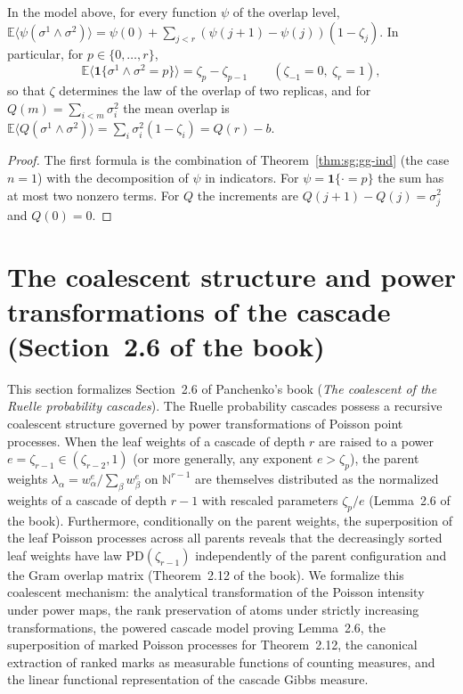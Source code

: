 \begin{theorem}\label{thm:sg:fop}
  \leanok
In the model above, for every function $\psi$ of the overlap level,
$\mathbb E\langle\psi(\sigma^1\wedge\sigma^2)\rangle=\psi(0)+\sum_{j<r}(\psi(j+1)-\psi(j))(1-\zeta_j)$. In particular, for $p\in\{0,\dots,r\}$,
\[
 \mathbb E\langle\mathbf 1\{\sigma^1\wedge\sigma^2=p\}\rangle=\zeta_p-\zeta_{p-1}\qquad(\zeta_{-1}=0,\ \zeta_r=1),
\]
so that $\zeta$ determines the law of the overlap of two replicas, and for $Q(m)=\sum_{i<m}\sigma_i^2$ the mean overlap is
$\mathbb E\langle Q(\sigma^1\wedge\sigma^2)\rangle=\sum_i\sigma_i^2(1-\zeta_i)=Q(r)-b$.
\end{theorem}
\begin{proof}
  \leanok
The first formula is the combination of Theorem~\ref{thm:sg:gg-ind} (the case $n=1$) with the decomposition of $\psi$ in indicators. For $\psi=\mathbf 1\{\cdot=p\}$ the sum has at most two nonzero terms. For $Q$ the increments are $Q(j+1)-Q(j)=\sigma_j^2$ and $Q(0)=0$.
\end{proof}

\section{The coalescent structure and power transformations of the cascade (Section~2.6 of the book)}\label{sec:sg:coalescent}

This section formalizes Section~2.6 of Panchenko's book (\emph{The coalescent of the Ruelle probability cascades}).
The Ruelle probability cascades possess a recursive coalescent structure governed by power transformations of Poisson point processes.
When the leaf weights of a cascade of depth $r$ are raised to a power $e = \zeta_{r-1} \in (\zeta_{r-2}, 1)$ (or more generally, any exponent $e > \zeta_p$),
the parent weights $\lambda_\alpha = w_\alpha^e / \sum_\beta w_\beta^e$ on $\mathbb N^{r-1}$ are themselves distributed as the normalized weights of a cascade of depth $r-1$
with rescaled parameters $\zeta_p / e$ (Lemma~2.6 of the book).
Furthermore, conditionally on the parent weights, the superposition of the leaf Poisson processes across all parents reveals that the decreasingly sorted leaf weights
have law $\mathrm{PD}(\zeta_{r-1})$ independently of the parent configuration and the Gram overlap matrix (Theorem~2.12 of the book).
We formalize this coalescent mechanism: the analytical transformation of the Poisson intensity under power maps, the rank preservation of atoms under strictly increasing
transformations, the powered cascade model proving Lemma~2.6, the superposition of marked Poisson processes for Theorem~2.12, the canonical extraction of ranked marks
as measurable functions of counting measures, and the linear functional representation of the cascade Gibbs measure.

